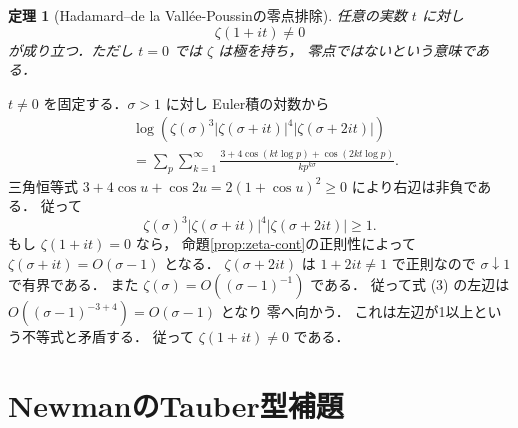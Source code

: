 \documentclass[a5paper,10pt,onecolumn]{jsarticle}
\makeatletter
\theoremstyle{mathnotetheorem}
\newtheorem{theorem}{定理}[section]
\renewcommand{\proofname}{証明}
\renewenvironment{proof}[1][\proofname]{%
  \par\pushQED{\qed}\normalfont\topsep4\p@\@plus2\p@\relax
  \trivlist\item[\hskip\labelsep\bfseries #1]\ignorespaces
}{\popQED\endtrivlist\@endpefalse}
\makeatother
\begin{document}
\begin{theorem}[Hadamard--de la Vall\'ee-Poussinの零点排除]
\label{thm:no-zero}
任意の実数 $t$ に対し
\[
 \zeta(1+it)\ne0
\]
が成り立つ．ただし $t=0$ では $\zeta$ は極を持ち，
零点ではないという意味である．
\end{theorem}
\begin{proof}
$t\ne0$ を固定する．$\sigma>1$ に対し
Euler積の対数から
\[
 \begin{aligned}
 &\log\!\left(
 \zeta(\sigma)^3
 |\zeta(\sigma+it)|^4
 |\zeta(\sigma+2it)|\right)\\
 &=\sum_p\sum_{k=1}^\infty
 \frac{3+4\cos(kt\log p)+\cos(2kt\log p)}
 {k p^{k\sigma}}.
 \end{aligned}
\]
三角恒等式
$3+4\cos u+\cos2u=2(1+\cos u)^2\ge0$
により右辺は非負である．
従って
\[
 \zeta(\sigma)^3
 |\zeta(\sigma+it)|^4
 |\zeta(\sigma+2it)|\ge1.
 \tag{3}
\]
もし $\zeta(1+it)=0$ なら，
命題\ref{prop:zeta-cont}の正則性によって
$\zeta(\sigma+it)=O(\sigma-1)$ となる．
$\zeta(\sigma+2it)$ は $1+2it\ne1$ で正則なので
$\sigma\downarrow1$ で有界である．
また $\zeta(\sigma)=O((\sigma-1)^{-1})$ である．
従って式 (3) の左辺は
$O((\sigma-1)^{-3+4})=O(\sigma-1)$ となり
零へ向かう．
これは左辺が1以上という不等式と矛盾する．
従って $\zeta(1+it)\ne0$ である．
\end{proof}

\section{NewmanのTauber型補題}
\end{document}
